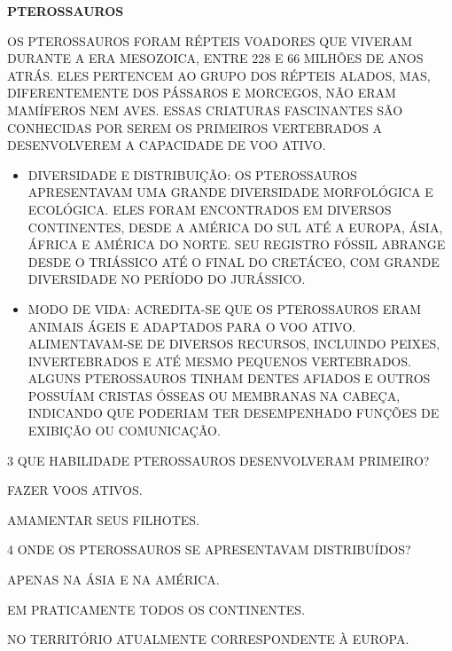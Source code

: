 \begin{myquote}
\textbf{PTEROSSAUROS}

OS PTEROSSAUROS FORAM RÉPTEIS VOADORES QUE VIVERAM DURANTE A ERA MESOZOICA, ENTRE 228 E 66 MILHÕES DE ANOS ATRÁS. ELES PERTENCEM AO GRUPO DOS RÉPTEIS ALADOS, MAS, DIFERENTEMENTE DOS PÁSSAROS E MORCEGOS, NÃO ERAM MAMÍFEROS NEM AVES. ESSAS CRIATURAS FASCINANTES SÃO CONHECIDAS POR SEREM OS PRIMEIROS VERTEBRADOS A DESENVOLVEREM A CAPACIDADE DE VOO ATIVO.


\begin{itemize}
\item DIVERSIDADE E DISTRIBUIÇÃO:
OS PTEROSSAUROS APRESENTAVAM UMA GRANDE DIVERSIDADE MORFOLÓGICA E ECOLÓGICA. ELES FORAM ENCONTRADOS EM DIVERSOS CONTINENTES, DESDE A AMÉRICA DO SUL ATÉ A EUROPA, ÁSIA, ÁFRICA E AMÉRICA DO NORTE. SEU REGISTRO FÓSSIL ABRANGE DESDE O TRIÁSSICO ATÉ O FINAL DO CRETÁCEO, COM GRANDE DIVERSIDADE NO PERÍODO DO JURÁSSICO.

\item MODO DE VIDA:
ACREDITA-SE QUE OS PTEROSSAUROS ERAM ANIMAIS ÁGEIS E ADAPTADOS PARA O VOO ATIVO. ALIMENTAVAM-SE DE DIVERSOS RECURSOS, INCLUINDO PEIXES, INVERTEBRADOS E ATÉ MESMO PEQUENOS VERTEBRADOS. ALGUNS PTEROSSAUROS TINHAM DENTES AFIADOS E OUTROS POSSUÍAM CRISTAS ÓSSEAS OU MEMBRANAS NA CABEÇA, INDICANDO QUE PODERIAM TER DESEMPENHADO FUNÇÕES DE EXIBIÇÃO OU COMUNICAÇÃO.
\end{itemize}

\end{myquote}

\num{3} QUE HABILIDADE PTEROSSAUROS DESENVOLVERAM PRIMEIRO?

\begin{boxlist}
 FAZER VOOS ATIVOS.

 AMAMENTAR SEUS FILHOTES.
\end{boxlist}

\num{4} ONDE OS PTEROSSAUROS SE APRESENTAVAM DISTRIBUÍDOS?

\begin{boxlist}
 APENAS NA ÁSIA E NA AMÉRICA.

 EM PRATICAMENTE TODOS OS CONTINENTES.

 NO TERRITÓRIO ATUALMENTE CORRESPONDENTE À EUROPA.
\end{boxlist}

